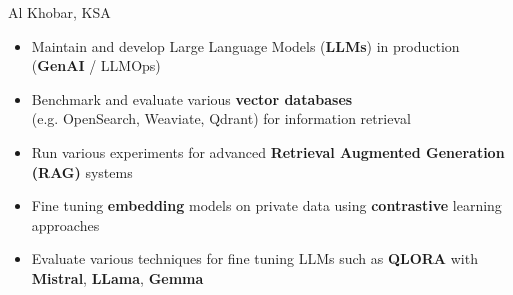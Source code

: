 \documentclass[10pt,a4paper,ragged2e]{altacv}
\begin{document}

\begin{fullwidth}
\makecvheader
\end{fullwidth}



     {Al Khobar, KSA}

\begin{itemize}
	\item  Maintain and develop Large Language Models (\textbf{LLMs}) in production (\textbf{GenAI} / LLMOps)
	\item Benchmark and evaluate various \textbf{vector databases} \\(e.g. OpenSearch, Weaviate, Qdrant) for information retrieval
	\item Run various experiments for advanced \textbf{Retrieval Augmented Generation (RAG)} systems
	\item Fine tuning \textbf{embedding} models on private data using \textbf{contrastive} learning approaches
	\item Evaluate various techniques for fine tuning LLMs such as \textbf{QLORA} with \textbf{Mistral}, \textbf{LLama}, \textbf{Gemma}

\end{itemize}
\end{document}
